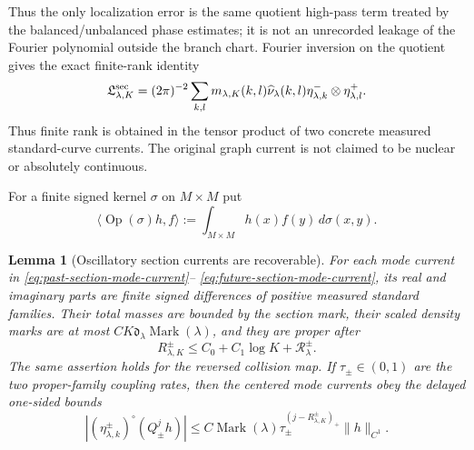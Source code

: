 \documentclass[11pt]{article}
\newtheorem{lemma}[theorem]{Lemma}
\begin{document}
Thus the only localization error is the same quotient high-pass term treated
by the balanced/unbalanced phase estimates; it is not an unrecorded leakage
of the Fourier polynomial outside the branch chart.
Fourier inversion on the quotient gives the exact
finite-rank identity
\begin{equation}
\label{eq:section-current-finite-rank}
 \mathfrak L^{\rm sec}_{\lambda,K}
 =(2\pi)^{-2}\sum_{k,l}
 m_{\lambda,K}(k,l)\widehat\nu_\lambda(k,l)
 \eta^-_{\lambda,k}\otimes\eta^+_{\lambda,l}.
\end{equation}
Thus finite rank is obtained in the tensor product of two concrete measured
standard-curve currents.  The original graph current is not claimed to be
nuclear or absolutely continuous.

For a finite signed kernel $\sigma$ on $M\times M$ put
\begin{equation}
\label{eq:kernel-operator-identification}
 \langle\operatorname{Op}(\sigma)h,f\rangle
 :=\int_{M\times M}h(x)f(y)\,d\sigma(x,y).
\end{equation}
\begin{lemma}[Oscillatory section currents are recoverable]
\label{lem:oscillatory-section-recovery}
For each mode current in
\eqref{eq:past-section-mode-current}--
\eqref{eq:future-section-mode-current}, its real and imaginary parts are
finite signed differences of positive measured standard families.  Their
total masses are bounded by the section mark, their scaled density marks are
at most
$CK\mathfrak d_\lambda\operatorname{Mark}(\lambda)$, and they are proper after
\begin{equation}
\label{eq:section-mode-recovery-time}
 R_{\lambda,K}^{\pm}\le C_0+C_1\log K+\mathcal R_\lambda^\pm.
\end{equation}
The same assertion holds for the reversed collision map.
If $\tau_\pm\in(0,1)$ are the two proper-family coupling rates, then the
centered mode currents obey the delayed one-sided bounds
\begin{equation}
\label{eq:section-mode-delayed-coupling}
 |(\eta^\pm_{\lambda,k})^\circ(Q_\pm^jh)|
 \le C\operatorname{Mark}(\lambda)
 \tau_\pm^{(j-R_{\lambda,K}^\pm)_+}\|h\|_{C^1}.
\end{equation}
\end{lemma}
\end{document}
